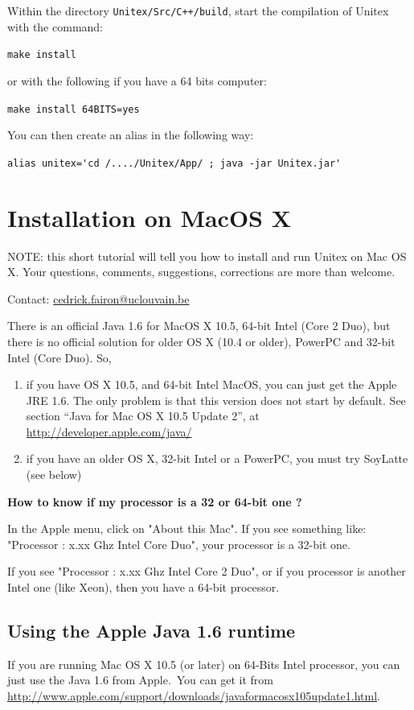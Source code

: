 \bigskip
\noindent Within the directory \verb|Unitex/Src/C++/build|, start the compilation
of Unitex with the command:

\bigskip \verb+make install+

\bigskip
\noindent or with the following if you have a 64 bits computer:
 
\bigskip \verb+make install 64BITS=yes+

\bigskip
\noindent You can then create an alias in the following way:

\bigskip \verb$alias unitex='cd /..../Unitex/App/ ; java -jar Unitex.jar'$


\section{Installation on MacOS X}
\label{section-macos-install}
\noindent NOTE: this short tutorial will tell you how to install and run 
Unitex on Mac OS X. Your questions, comments, suggestions, 
corrections are more than welcome. 

\noindent Contact: \url{cedrick.fairon@uclouvain.be}

\bigskip
\noindent There is an official Java 1.6 for MacOS X 10.5, 64-bit Intel 
(Core 2 Duo), but there is no official solution for older OS X (10.4 or older),
PowerPC and 32-bit Intel (Core Duo). So,
\begin{enumerate}
    \item if you have OS X 10.5, and 64-bit Intel MacOS, you can just get the
    Apple JRE 1.6. The only problem is that this version does not start by
    default. See section ``Java for Mac OS X 10.5 Update 2'', 
    at \url{http://developer.apple.com/java/}

    \item if you have an older OS X, 32-bit Intel or a PowerPC, you must try
    SoyLatte (see below)
\end{enumerate}

\noindent\textbf{How to know if my processor is a 32 or 64-bit one ?}

\noindent In the Apple menu, click on "About this Mac". If you see something
like: "Processor : x.xx Ghz Intel Core Duo", your processor is a 32-bit one.

\bigskip
\noindent If you see "Processor : x.xx Ghz Intel Core 2 Duo", or if you
processor is another Intel one (like Xeon), then you have a 64-bit processor.

\subsection{Using the Apple Java 1.6 runtime}
\bigskip{}
\noindent If you are running Mac OS X 10.5 (or later) on 64-Bits Intel processor, you can just use the Java 1.6 from Apple.\ You can get it from \url{http://www.apple.com/support/downloads/javaformacosx105update1.html}.

